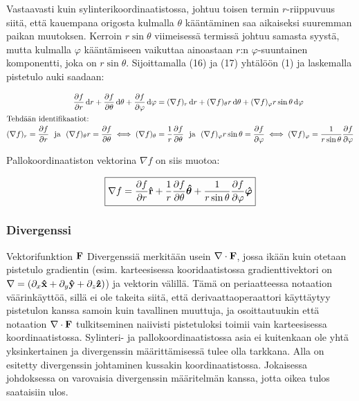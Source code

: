 \documentclass[../johdoksia.tex]{subfiles}
\begin{document}
\begin{enumerate}
		Vastaavasti kuin sylinterikoordinaatistossa, johtuu toisen termin $r$-riippuvuus siitä, että kauempana origosta kulmalla $\theta$ kääntäminen saa aikaiseksi suuremman paikan muutoksen. Kerroin $r\sin\theta$ viimeisessä termissä johtuu samasta syystä, mutta kulmalla $\varphi$ kääntämiseen vaikuttaa ainoastaan $r$:n $\varphi$-suuntainen komponentti, joka on $r\sin\theta$. Sijoittamalla (16) ja (17) yhtälöön (1) ja laskemalla pistetulo auki saadaan:
		
		\begin{align}
			\pdv{f}{r}\odif{r} + \pdv{f}{\theta}\odif{\theta} + \pdv{f}{\varphi}\odif{\varphi} &= (\nabla f)_r\odif{r} + (\nabla f)_\theta r\odif{\theta} + (\nabla f)_\varphi r\sin\theta\odif{\varphi} \\
			\intertext{Tehdään identifikaatiot:}
			(\nabla f)_r = \pdv{f}{r} \ \ \text{ja} \ \ (\nabla f)_\theta r = \pdv{f}{\theta} \iff (\nabla f)_\theta &= \frac{1}{r}\pdv{f}{\theta} \ \ \text{ja} \ \ (\nabla f)_\varphi r\sin\theta = \pdv{f}{\varphi} \iff (\nabla f)_\varphi = \frac{1}{r\sin\theta}\pdv{f}{\varphi}
		\end{align}
		
		\noindent Pallokoordinaatiston vektorina $\nabla f$ on siis muotoa:
		
		\begin{equation}
			\boxed{\nabla f = \pdv{f}{r}\mathbf{\hat{r}} + \frac{1}{r}\pdv{f}{\theta}\boldsymbol{\hat{\theta}} + \frac{1}{r\sin\theta}\pdv{f}{\varphi}\boldsymbol{\hat{\varphi}}}
		\end{equation}
		
	\end{enumerate}
	
	\subsubsection{Divergenssi}
	
	Vektorifunktion $\mathbf{F}$ Divergenssiä merkitään usein $\nabla\cdot\mathbf{F}$, jossa ikään kuin otetaan pistetulo gradientin (esim. karteesisessa kooridaatistossa gradienttivektori on $\nabla = (\partial_x\mathbf{\hat{x}} + \partial_y\mathbf{\hat{y}} + \partial_z\mathbf{\hat{z}})$) ja vektorin välillä. Tämä on periaatteessa notaation väärinkäyttöä, sillä ei ole takeita siitä, että derivaattaoperaattori käyttäytyy pistetulon kanssa samoin kuin tavallinen muuttuja, ja osoittautuukin että notaation $\nabla\cdot\mathbf{F}$ tulkitseminen naiivisti pistetuloksi toimii vain karteesisessa koordinaatistossa. Sylinteri- ja pallokoordinaatistossa asia ei kuitenkaan ole yhtä yksinkertainen ja divergenssin määrittämisessä tulee olla tarkkana. Alla on esitetty divergenssin johtaminen kussakin koordinaatistossa. Jokaisessa johdoksessa on varovaisia divergenssin määritelmän kanssa, jotta oikea tulos saataisiin ulos.
	
\end{document}
